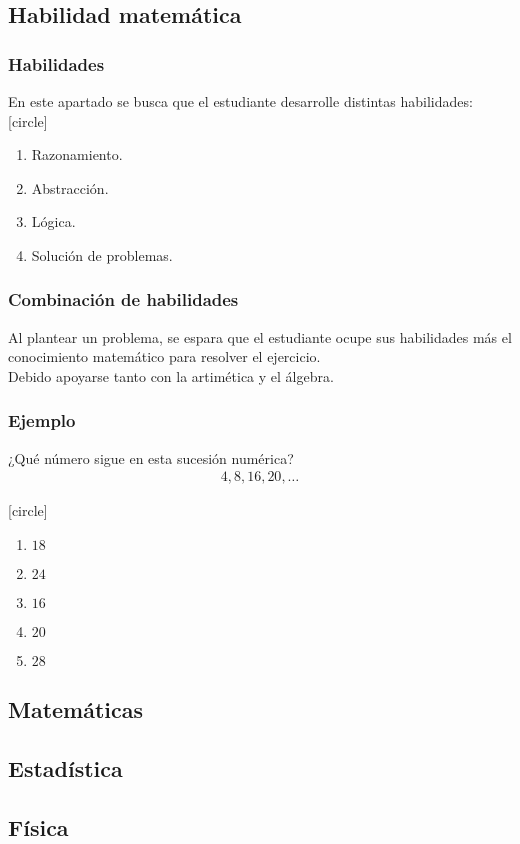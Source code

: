 \subsection{Habilidad matemática}
\begin{frame}
\frametitle{Habilidades}
En este apartado se busca que el estudiante desarrolle  distintas habilidades:
[circle]
\begin{enumerate}[<+->]
\item Razonamiento.
\item Abstracción.
\item Lógica.
\item Solución de problemas.
\end{enumerate}
\end{frame}
\begin{frame}
\frametitle{Combinación de habilidades}
Al plantear un problema, se espara que el estudiante ocupe sus habilidades más el conocimiento matemático para resolver el ejercicio.
\\
\bigskip
\pause
Debido apoyarse tanto con la artimética y el álgebra.
\end{frame}
\begin{frame}
\frametitle{Ejemplo}
¿Qué número sigue en esta sucesión numérica?
\begin{align*}
4, 8, 16, 20, \ldots
\end{align*}

[circle]
\begin{enumerate}
\item $18$
\item $24$
\item $16$
\item $20$
\item $28$
\end{enumerate}
\end{frame}
\subsection{Matemáticas}

\subsection{Estadística}

\subsection{Física}
